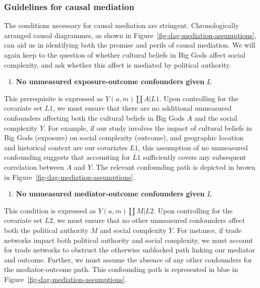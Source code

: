 \documentclass[
  singlecolumn]{report}
\providecommand{\tightlist}{%
  \setlength{\itemsep}{0pt}\setlength{\parskip}{0pt}}\usepackage{longtable,booktabs,array}
\begin{document}
\hypertarget{guidelines-for-causal-mediation}{%
\subsubsection{Guidelines for causal
mediation}\label{guidelines-for-causal-mediation}}

The conditions necessary for causal mediation are stringent.
Chronologically arranged causal diagrammes, as shown in
Figure~\ref{fig-dag-mediation-assumptions}, can aid us in identifying
both the promise and perils of causal mediation. We will again keep to
the question of whether cultural beliefs in Big Gods affect social
complexity, and ask whether this affect is mediated by political
authority.

\begin{enumerate}
\def\labelenumi{\arabic{enumi}.}
\tightlist
\item
  \textbf{No unmeasured exposure-outcome confounders given} \(L\)
\end{enumerate}

This prerequisite is expressed as \(Y(a,m) \coprod A | L1\). Upon
controlling for the covariate set \(L1\), we must ensure that there are
no additional unmeasured confounders affecting both the cultural beliefs
in Big Gods \(A\) and the social complexity \(Y\). For example, if our
study involves the impact of cultural beliefs in Big Gods (exposure) on
social complexity (outcome), and geographic location and historical
context are our covariates \(L1\), this assumption of no unmeasured
confounding suggests that accounting for \(L1\) sufficiently covers any
subsequent correlation between \(A\) and \(Y\). The relevant confounding
path is depicted in brown in Figure~\ref{fig-dag-mediation-assumptions}.

\begin{enumerate}
\def\labelenumi{\arabic{enumi}.}
\setcounter{enumi}{1}
\tightlist
\item
  \textbf{No unmeasured mediator-outcome confounders given} \(L\)
\end{enumerate}

This condition is expressed as \(Y(a,m) \coprod M | L2\). Upon
controlling for the covariate set \(L2\), we must ensure that no other
unmeasured confounders affect both the political authority \(M\) and
social complexity \(Y\). For instance, if trade networks impact both
political authority and social complexity, we must account for trade
networks to obstruct the otherwise unblocked path linking our mediator
and outcome. Further, we must assume the absence of any other
confounders for the mediator-outcome path. This confounding path is
represented in blue in Figure~\ref{fig-dag-mediation-assumptions}.
\end{document}
